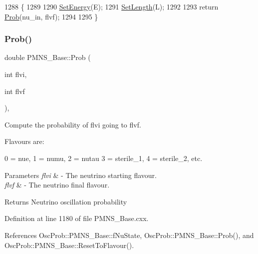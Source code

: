 \begin{DoxyCode}
1288 \{
1289 
1290   \hyperlink{classOscProb_1_1PMNS__Base_a95b3b0d0cab5e6a54b5ef99587f837c0}{SetEnergy}(E);
1291   \hyperlink{classOscProb_1_1PMNS__Base_a6241325b1bd28cafa556daaecbe4ed62}{SetLength}(L);
1292 
1293   \textcolor{keywordflow}{return} \hyperlink{classOscProb_1_1PMNS__Base_aa2e10704d2d205a1ec8988de14b1a66f}{Prob}(nu\_in, flvf);
1294 
1295 \}
\end{DoxyCode}
\mbox{\label{classOscProb_1_1PMNS__Base_aec5c399b93261f1962a4b7dbbb44b973}} 
\subsubsection{\texorpdfstring{Prob()}{Prob()}\hspace{0.1cm}{\footnotesize\ttfamily [4/6]}}
{\footnotesize\ttfamily double P\+M\+N\+S\+\_\+\+Base\+::\+Prob (\begin{DoxyParamCaption}\item[{int}]{flvi,  }\item[{int}]{flvf }\end{DoxyParamCaption})\hspace{0.3cm}{\ttfamily [virtual]}, {\ttfamily [inherited]}}

Compute the probability of flvi going to flvf.

Flavours are\+: 
\begin{DoxyPre}
  0 = nue, 1 = numu, 2 = nutau
  3 = sterile\_1, 4 = sterile\_2, etc.
\end{DoxyPre}
 
\begin{DoxyParams}{Parameters}
{\em flvi} & -\/ The neutrino starting flavour. \\
\hline
{\em flvf} & -\/ The neutrino final flavour.\\
\hline
\end{DoxyParams}
\begin{DoxyReturn}{Returns}
Neutrino oscillation probability 
\end{DoxyReturn}


Definition at line 1180 of file P\+M\+N\+S\+\_\+\+Base.\+cxx.



References Osc\+Prob\+::\+P\+M\+N\+S\+\_\+\+Base\+::f\+Nu\+State, Osc\+Prob\+::\+P\+M\+N\+S\+\_\+\+Base\+::\+Prob(), and Osc\+Prob\+::\+P\+M\+N\+S\+\_\+\+Base\+::\+Reset\+To\+Flavour().


